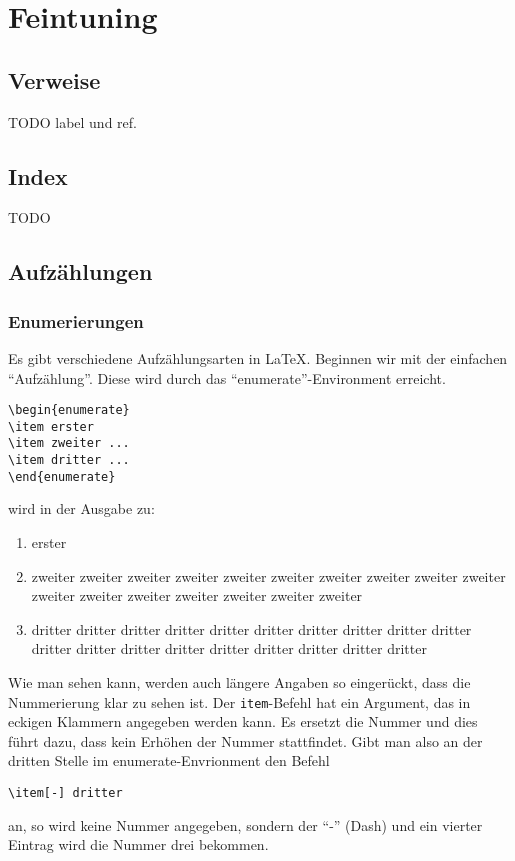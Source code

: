 
\chapter{Feintuning}


\section{Verweise}\label{sect:verweise}

TODO label und ref.

\section{Index}

TODO


\section{Aufzählungen}

\subsection{Enumerierungen}

Es gibt verschiedene Aufzählungsarten in \LaTeX. Beginnen wir mit der einfachen "`Aufzählung"'. Diese wird durch das "`enumerate"'-Environment erreicht.
\begin{verbatim}
\begin{enumerate}
\item erster
\item zweiter ...
\item dritter ...
\end{enumerate}
\end{verbatim}
wird in der Ausgabe zu:
\begin{enumerate}
\item erster
\item zweiter zweiter zweiter zweiter zweiter zweiter zweiter zweiter zweiter zweiter zweiter zweiter zweiter zweiter zweiter zweiter zweiter
\item dritter dritter dritter dritter dritter dritter dritter dritter dritter dritter dritter dritter dritter dritter dritter dritter dritter dritter dritter 
\end{enumerate}

Wie man sehen kann, werden auch längere Angaben so eingerückt, dass die Nummerierung klar zu sehen ist. Der \texttt{item}-Befehl hat ein Argument, das in eckigen Klammern angegeben werden kann. Es ersetzt die Nummer und dies führt dazu, dass kein Erhöhen der Nummer stattfindet. Gibt man also an der dritten Stelle im enumerate-Envrionment den Befehl
\begin{verbatim}
\item[-] dritter
\end{verbatim}
an, so wird keine Nummer angegeben, sondern der "`-"' (Dash) und ein vierter Eintrag wird die Nummer drei bekommen.

